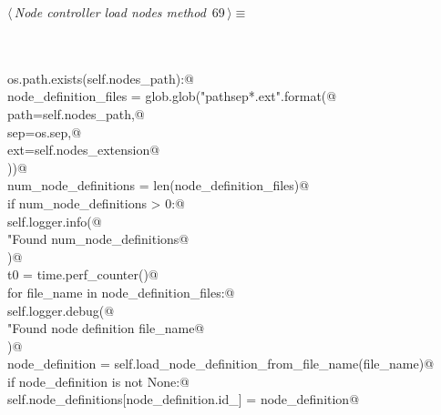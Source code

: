 \documentclass[
    a4paper,      %
    10pt,         %
    openright,    %
    notitlepage,  %
    parskip=half, %
]{scrreprt}       %
\theoremstyle{definition}                    %
\begin{document}
\begin{flushleft} \small
\begin{minipage}{\linewidth}\label{scrap114}\raggedright\small
{} $\langle\,${\itshape Node controller load nodes method}\nobreak\ {\footnotesize {69}}$\,\rangle\equiv$
\vspace{-1exm}
\begin{list}{}{} \item
\mbox{}\lstinline@@\\
\mbox{}\lstinline@@\\
\mbox{}\lstinline@if os.path.exists(self.nodes_path):@\\
\mbox{}\lstinline@    node_definition_files = glob.glob("{path}{sep}*.{ext}".format(@\\
\mbox{}\lstinline@        path=self.nodes_path,@\\
\mbox{}\lstinline@        sep=os.sep,@\\
\mbox{}\lstinline@        ext=self.nodes_extension@\\
\mbox{}\lstinline@    ))@\\
\mbox{}\lstinline@    num_node_definitions = len(node_definition_files)@\\
\mbox{}\lstinline@    if num_node_definitions > 0:@\\
\mbox{}\lstinline@        self.logger.info(@\\
\mbox{}\lstinline@            "Found %d node definition(s), loading.",@\\
\mbox{}\lstinline@            num_node_definitions@\\
\mbox{}\lstinline@        )@\\
\mbox{}\lstinline@        t0 = time.perf_counter()@\\
\mbox{}\lstinline@        for file_name in node_definition_files:@\\
\mbox{}\lstinline@            self.logger.debug(@\\
\mbox{}\lstinline@                "Found node definition %s, trying to load",@\\
\mbox{}\lstinline@                file_name@\\
\mbox{}\lstinline@            )@\\
\mbox{}\lstinline@            node_definition = self.load_node_definition_from_file_name(file_name)@\\
\mbox{}\lstinline@            if node_definition is not None:@\\
\mbox{}\lstinline@                self.node_definitions[node_definition.id_] = node_definition@\\

\end{list}
\end{minipage}
\end{flushleft}
\end{document}
